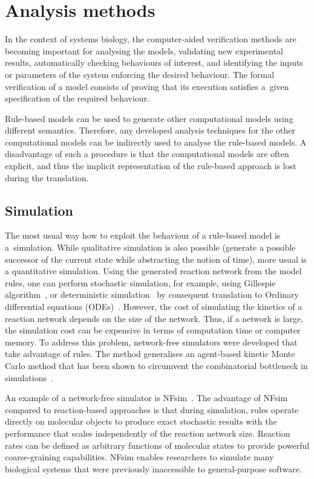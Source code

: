 \documentclass[11pt,a4paper]{report}
\begin{document}
\section{Analysis methods}\label{analysis_sec}

In the context of systems biology, the computer-aided verification methods are becoming important for analysing the models, validating new experimental results, automatically checking behaviours of interest, and identifying the inputs or parameters of the system enforcing the desired behaviour. The formal verification of a model consists of proving that its execution satisfies a~given specification of the required behaviour.

Rule-based models can be used to generate other computational models using different semantics. Therefore, any developed analysis techniques for the other computational models can be indirectly used to analyse the rule-based models. A disadvantage of such a procedure is that the computational models are often explicit, and thus the implicit representation of the rule-based approach is lost during the translation. 

\subsection{Simulation}

The most usual way how to exploit the behaviour of a rule-based model is a~simulation. While qualitative simulation is also possible (generate a possible successor of the current state while abstracting the notion of time), more usual is a quantitative simulation. Using the generated reaction network from the model rules, one can perform stochastic simulation, for example, using Gillespie algorithm~\cite{GILLESPIE1976403}, or deterministic simulation~\cite{Poole2000} by consequent translation to Ordinary differential equations (ODEs)~\cite{higham2008modeling}. However, the cost of simulating the kinetics of a reaction network depends on the size of the network. Thus, if a network is large, the simulation cost can be expensive in terms of computation time or computer memory. To address this problem, network-free simulators were developed that take advantage of rules. The method generalises an agent-based kinetic Monte Carlo method that has been shown to circumvent the combinatorial bottleneck in simulations~\cite{yang2008kinetic}.

An example of a network-free simulator is NFsim~\cite{sneddon2011efficient}. The advantage of NFsim compared to reaction-based approaches is that during simulation, rules operate directly on molecular objects to produce exact stochastic results with the performance that scales independently of the reaction network size. Reaction rates can be defined as arbitrary functions of molecular states to provide powerful coarse-graining capabilities. NFsim enables researchers to simulate many biological systems that were previously inaccessible to general-purpose software.
\end{document}
